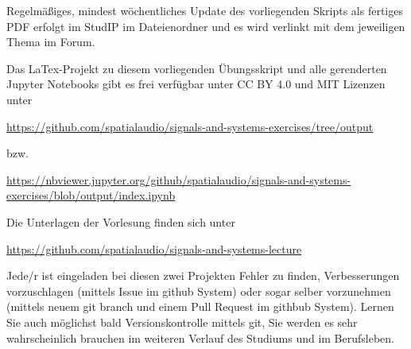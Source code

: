 Regelmäßiges, mindest wöchentliches Update des vorliegenden Skripts als fertiges PDF
erfolgt im StudIP im Dateienordner und es wird verlinkt mit dem jeweiligen Thema
im Forum.
%

\newpage
Das LaTex-Projekt zu diesem vorliegenden Übungsskript und alle gerenderten Jupyter
Notebooks gibt es frei verfügbar unter CC BY 4.0 und MIT Lizenzen unter
\begin{mdframed}[backgroundcolor=C2!10]
\url{https://github.com/spatialaudio/signals-and-systems-exercises/tree/output}
\end{mdframed}
bzw.
\begin{mdframed}[backgroundcolor=C2!10]
\url{https://nbviewer.jupyter.org/github/spatialaudio/signals-and-systems-exercises/blob/output/index.ipynb}
\end{mdframed}
%

%
Die Unterlagen der Vorlesung finden sich unter
\begin{mdframed}[backgroundcolor=C2!10]
\url{https://github.com/spatialaudio/signals-and-systems-lecture}
\end{mdframed}
%
Jede/r ist eingeladen bei diesen zwei Projekten Fehler zu finden, Verbesserungen
vorzuschlagen (mittels Issue im github System) oder sogar selber vorzunehmen
(mittels neuem git branch und einem Pull Request im githbub System).
%
Lernen Sie auch möglichst bald Versionskontrolle mittels git, Sie werden es sehr
wahrscheinlich brauchen im weiteren Verlauf des Studiums und im Berufsleben.

\newpage
